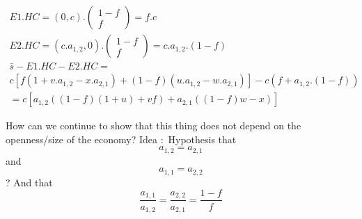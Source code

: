 \documentclass[11pt,a4paper]{article}
\begin{document}
\begin{gather*}
E1.HC = \left(0,c\right).\left(\begin{matrix}1-f\\f\end{matrix}\right)=f.c
\\
E2.HC=\left(c.a_{1,2},0\right).\left(\begin{matrix}1-f\\f\end{matrix}\right)=c.a_{1,2}.\left(1-f\right)
\\ 
\bar{s}-E1.HC-E2.HC=
\\
c\left[f\left(1+v.a_{1,2}-x.a_{2,1}\right)+\left(1-f\right)\left(u.a_{1,2}-w.a_{2,1}\right)\right]-c\left(f+a_{1,2}.\left(1-f\right)\right)
\\
=c\left[a_{1,2}\left(\left(1-f\right)\left(1+u\right)+vf\right)+a_{2,1}\left(\left(1-f\right)w-x\right)\right]
\end{gather*}

How can we continue to show that this thing does not depend on the openness/size of the economy? Idea : Hypothesis that $$a_{1,2}=a_{2,1}$$ and $$a_{1,1}=a_{2,2}$$ ?
And that $$\frac{a_{1,1}}{a_{1,2}}=\frac{a_{2,2}}{a_{2,1}}=\frac{1-f}{f}$$
\end{document}
